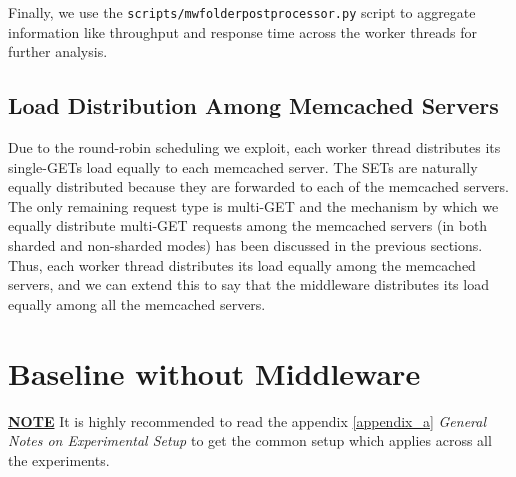 \documentclass[11pt,a4paper]{article}
\begin{document}
	Finally, we use the \texttt{scripts/mw\textunderscore folder\textunderscore postprocessor.py} script to aggregate information like throughput and response time across the worker threads for further analysis.
	
	\subsection{Load Distribution Among Memcached Servers}
	
	Due to the round-robin scheduling we exploit, each worker thread distributes its single-GETs load equally to each memcached server. The SETs are naturally equally distributed because they are forwarded to each of the memcached servers. The only remaining request type is multi-GET and the mechanism by which we equally distribute multi-GET requests among the memcached servers (in both sharded and non-sharded modes) has been discussed in the previous sections.
	Thus, each worker thread distributes its load equally among the memcached servers, and we can extend this to say that the middleware distributes its load equally among all the memcached servers. 



\section{Baseline without Middleware} %

\underline{\textbf{NOTE}} It is highly recommended to read the appendix \ref{appendix_a} \emph{General Notes on Experimental Setup} to get the common setup which applies across all the experiments.

\end{document}
